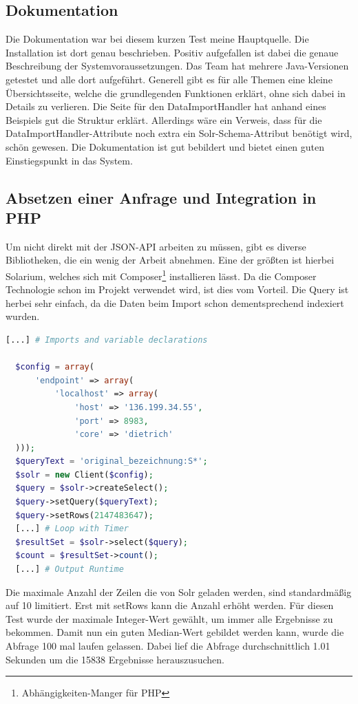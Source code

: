 \subsection{Dokumentation}

Die Dokumentation war bei diesem kurzen Test meine Hauptquelle. Die Installation ist dort genau beschrieben. Positiv aufgefallen ist dabei die genaue Beschreibung der Systemvoraussetzungen. Das Team hat mehrere Java-Versionen getestet und alle dort aufgeführt. 
Generell gibt es für alle Themen eine kleine Übersichtsseite, welche die grundlegenden Funktionen erklärt, ohne sich dabei in Details zu verlieren. 
Die Seite für den DataImportHandler hat anhand eines Beispiels gut die Struktur erklärt. Allerdings wäre ein Verweis, dass für die DataImportHandler-Attribute noch extra ein Solr-Schema-Attribut benötigt wird, schön gewesen.
Die Dokumentation ist gut bebildert und bietet einen guten Einstiegspunkt in das System.

\subsection{Absetzen einer Anfrage und Integration in PHP}

Um nicht direkt mit der JSON-API arbeiten zu müssen, gibt es diverse Bibliotheken, die ein wenig der Arbeit abnehmen. Eine der größten ist hierbei Solarium, welches sich mit Composer\footnote{Abhängigkeiten-Manger für PHP} installieren lässt. Da die Composer Technologie schon im Projekt verwendet wird, ist dies vom Vorteil.
Die Query ist herbei sehr einfach, da die Daten beim Import schon dementsprechend indexiert wurden.

\begin{lstlisting}[language=php, frame=single, label={lst:SolrPhp}, 
  morekeywords={type,uninvertible,indexed,stored,field,multiValued, name}] 
  [...] # Imports and variable declarations

  $config = array(
      'endpoint' => array(
          'localhost' => array(
              'host' => '136.199.34.55',
              'port' => 8983,
              'core' => 'dietrich'
  )));
  $queryText = 'original_bezeichnung:S*';
  $solr = new Client($config);
  $query = $solr->createSelect();
  $query->setQuery($queryText);
  $query->setRows(2147483647); 
  [...] # Loop with Timer
  $resultSet = $solr->select($query);
  $count = $resultSet->count();
  [...] # Output Runtime
\end{lstlisting}

Die maximale Anzahl der Zeilen die von Solr geladen werden, sind standardmäßig auf 10 limitiert. Erst mit setRows kann die Anzahl erhöht werden. Für diesen Test wurde der maximale Integer-Wert gewählt, um immer alle Ergebnisse zu bekommen. Damit nun ein guten Median-Wert gebildet werden kann, wurde die Abfrage 100 mal laufen gelassen. Dabei lief die Abfrage durchschnittlich 1.01 Sekunden um die 15838 Ergebnisse herauszusuchen. 
